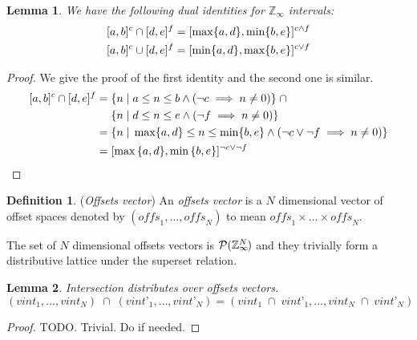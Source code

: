 \documentclass{article}
\theoremstyle{definition}
\newtheorem{defn}{Definition}
\theoremstyle{plain}
\newtheorem{lem}{Lemma}
\theoremstyle{remark}
\newcommand{\zinf}{\textnormal{$\mathbb{Z}_\infty$}}
\newcommand{\interv}[3]{\textnormal{$\lbrack#1,#2\rbrack^{#3}$}}
\newcommand{\unused}[1]{{\color{unused} #1}}
\begin{document}
\begin{lem}{}\label{lem:zinf-identities}
  We have the following dual identities for \zinf{} intervals:
%
  \begin{align*}
    \interv{a}{b}{c} \cap \interv{d}{e}{f} & =
      \interv{\max \{a,d\}}{\min \{b,e\}}{c \wedge f} \\
    \interv{a}{b}{c} \cup \interv{d}{e}{f} & =
      \interv{\min \{a,d\}}{\max \{b,e\}}{c \vee f}
  \end{align*}
\end{lem}
%
\begin{proof}
  We give the proof of the first identity and the second one is similar.
  \begin{align*}
    \interv{a}{b}{c} \cap \interv{d}{e}{f} = &
      \; \{ n \;|\; a \leq n \leq b \wedge (\neg c \implies n \neq 0) \}
      \;\cap \\
      & \; \{ n \;|\; d \leq n \leq e \wedge (\neg f \implies n \neq 0) \}
      \\
    = & \; \{ n \;|\; \max \{a,d\} \leq n \leq \min \{b,e\} \wedge (\neg c
      \vee \neg f \implies n \neq 0) \} \\
    = & \; \interv{\max{\{a,d\}}}{\min{\{b,e\}}}{\neg c \vee \neg f}
  \end{align*}
\end{proof}

\begin{defn}{(\emph{Offsets vector})}
  An \emph{offsets vector} is a $N$ dimensional vector of offset spaces denoted
  by $(\textit{offs}_1, \dots, \textit{offs}_N)$ to mean $\textit{offs}_1 \times
  \dots \times \textit{offs}_N$.

  The set of $N$ dimensional offsets vectors is
  $\mathcal{P}{(\zinf{}^{\mkern-19mu{N}})}$ and they trivially form a
  distributive lattice under the superset relation.
\end{defn}

\unused{
\begin{lem}{}\label{lem:vector-intersect}
  Intersection distributes over offsets vectors.
%
  \begin{equation*}
    (\textit{vint}_1, \dots, \textit{vint}_N) \;\cap\;
      (\textit{vint'}_1, \dots, \textit{vint'}_N)
      =
    (\textit{vint}_1 \;\cap\; \textit{vint'}_1, \dots,
     \textit{vint}_N \;\cap\; \textit{vint'}_N)
  \end{equation*}
\end{lem}
%
\begin{proof}
  TODO. Trivial. Do if needed.
\end{proof}
}
\end{document}
